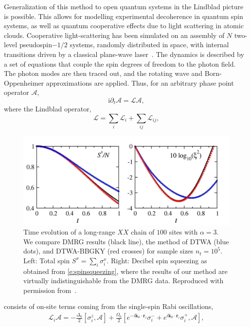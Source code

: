 \documentclass[extendedabs]{bmvc2k}
\newcommand\ii{{\mathrm{i}}}
\newcommand{\Com}[2]{\left[{#1},{#2}\right]}
\begin{document}
Generalization of this method to open quantum systems in the Lindblad picture is possible. This allows for modelling experimental decoherence in quantum spin systems, as well as quantum cooperative effects due to light scattering in atomic clouds. Cooperative light-scattering has been simulated on an assembly of $N$ two-level pseudospin$-1/2$ systems, randomly distributed in space, with internal transitions driven by a classical plane-wave  laser~\cite{Pucci17}. The dynamics is described by a set of equations that couple the spin degrees of freedom to the photon field. The photon modes are then traced out, and the rotating wave and Born-Oppenheimer approximations are applied. Thus, for an arbitrary phase point operator $\mathscr{A}$, 
\begin{equation}\label{VNeqdWA}
\ii\partial_t\mathscr{A}=\mathcal{L}\mathscr{A},
\end{equation}
where the Lindblad operator,
\begin{equation}\label{e:Lindblad}
\mathcal{L}=\sum_ i\mathcal{L}_ i+\sum_{ i j}\mathcal{L}_{ i j},
\end{equation}
\begin{figure}\centering
\includegraphics[width=\linewidth]{./images/fig3.jpg}
\caption{\label{f:XX}%
Time evolution of a long-range $XX$ chain of $100$ sites with $\alpha=3$. We compare DMRG results (black line), the method of DTWA (blue dots), and DTWA-BBGKY (red crosses) for sample sizes $n_t=10^5$. Left: Total spin $S^x=\sum_i\sigma_i^x$. Right: Decibel spin squeezing as obtained from \eqref{e:spinsqueezing}, where the results of our method are virtually indistinguishable from the DMRG data. Reproduced with permission from~\cite{Pucci16}.}%
\end{figure}
consists of on-site terms coming from the single-spin Rabi oscillations,
\begin{multline}
\mathcal{L}_ i\mathscr{A}=-\frac{\Delta_0}{2}\Com{\sigma_ i^z}{\mathscr{A}}
+\frac{\Omega_0}{2}\Com{e^{- i\mathbf{k}_0\cdot\mathbf{r}_ i}\sigma_ i^-+e^{ i\mathbf{k}_0\cdot\mathbf{r}_ i}\sigma_ i^+}{\mathscr{A}},
\end{multline}
\end{document}
